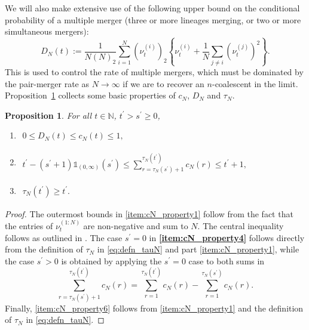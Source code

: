 \documentclass[12pt,authoryear]{article}
\newtheorem{prop}{Proposition}
\theoremstyle{definition}
\newcommand{\1}[1]{\mathbbm{1}_{#1}}
\begin{document}
We will also make extensive use of the following upper bound \citep{koskela2020annals} on the conditional probability of a multiple merger (three or more lineages merging, or two or more simultaneous mergers):
\begin{equation}\label{eq:defn_DN}
D_N(t) := \frac{1}{N(N)_2} \sum_{i=1}^N (\nu_t^{(i)})_2
        \left\{ \nu_t^{(i)} + \frac{1}{N} \sum_{j\neq i} (\nu_t^{(j)})^2 \right\} .
\end{equation} 
This is used to control the rate of multiple mergers, which must be dominated by the pair-merger rate as $N\to\infty$ if we are to recover an $n$-coalescent in the limit.
Proposition~\ref{thm:cN_properties} collects some basic properties of $c_N$, $D_N$ and $\tau_N$.
\begin{prop}\label{thm:cN_properties}
For all $t\in\mathbb{N}$, $t^\prime > s^\prime \geq 0$,
\begin{enumerate}[label=$(\alph*)$]
\item \label{item:cN_property1} \hspace{5pt}
    $\begin{aligned}
    0 \leq D_N(t) \leq c_N(t) \leq 1,
    \end{aligned}$
\item \label{item:cN_property4} \hspace{5pt}
    $\begin{aligned}
    t^\prime - (s^\prime + 1) \mathds{1}_{ ( 0, \infty ) }( s^\prime )
    \leq \sum_{r=\tau_N(s^\prime) + 1}^{\tau_N(t^\prime)} c_N(r)
    \leq t^\prime +1,
    \end{aligned}$
\item \label{item:cN_property6} \hspace{5pt}
    $\begin{aligned}
    \tau_N(t^\prime) \geq t^\prime.
    \end{aligned}$
\end{enumerate}
\end{prop}

\begin{proof}
The outermost bounds in \ref{item:cN_property1} follow from the fact that the entries of $\nu_t^{(1:N)}$ are non-negative and sum to $N$.
The central inequality follows as outlined in \citet[Supplement, p.\ 13--14]{koskela2022erratum}.
The case $s^{\prime} = 0$ in \textbf{\ref{item:cN_property4}} follows directly from the definition of $\tau_N$ in \eqref{eq:defn_tauN} and part \ref{item:cN_property1}, while the case $s^{\prime} > 0$ is obtained by applying the $s^{\prime} = 0$ case to both sums in
\begin{equation*}
\sum_{r=\tau_N(s^\prime)+1}^{\tau_N(t^\prime)} c_N(r)
= \sum_{r=1}^{\tau_N(t^\prime)} c_N(r) 
        - \sum_{r=1}^{\tau_N(s^\prime)} c_N(r) .
\end{equation*}
Finally, \ref{item:cN_property6} follows from \ref{item:cN_property1} and the definition of $\tau_N$ in \eqref{eq:defn_tauN}.
\end{proof}
\end{document}
